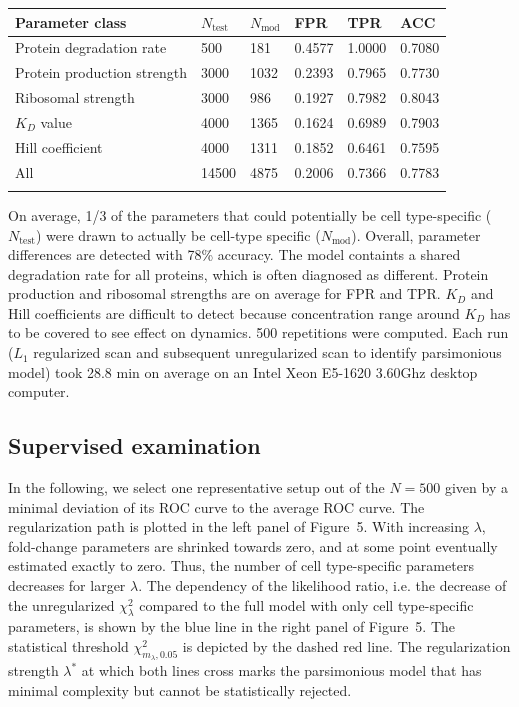 \documentclass{bioinfo}
\begin{document}
\begin{table}[!t]
 {\begin{tabular}{@{}llllll@{}}\toprule Parameter class &
$N_\text{test}$ & $N_\text{mod}$ & FPR & TPR & ACC\\\midrule
Protein degradation rate & 500 & 181 & 0.4577 & 1.0000 & 0.7080\\
Protein production strength & 3000 & 1032 & 0.2393 & 0.7965 & 0.7730\\
Ribosomal strength & 3000 & 986 & 0.1927 & 0.7982 & 0.8043\\
$K_D$ value & 4000 & 1365 & 0.1624 & 0.6989 & 0.7903\\
Hill coefficient & 4000 & 1311 & 0.1852 & 0.6461 & 0.7595\\\hline
All & 14500 & 4875 & 0.2006 & 0.7366 & 0.7783\\\botrule
\end{tabular}}{On average, 1/3 of the parameters that could potentially be cell type-specific ($N_\text{test}$) were drawn to actually be cell-type specific ($N_\text{mod}$). Overall, parameter differences are detected with 78\% accuracy. The model containts a shared degradation rate for all proteins, which is often diagnosed as different. Protein production and ribosomal strengths are on average for FPR and TPR. $K_D$ and Hill coefficients are difficult to detect because concentration range around $K_D$ has to be covered to see effect on dynamics. 500 repetitions were computed. Each run ($L_1$ regularized scan and subsequent unregularized scan to identify parsimonious model) took 28.8 min on average on an Intel Xeon E5-1620 3.60Ghz desktop computer.}
\end{table}

\subsection{Supervised examination} %
In the following, we select one representative setup out of the $N=500$ given by a minimal deviation of its ROC curve to the average ROC curve.
The regularization path is plotted in the left panel of Figure~5\vphantom{\ref{fig:05}}.
With increasing $\lambda$, fold-change parameters are shrinked towards zero, and at some point eventually estimated exactly to zero.
Thus, the number of cell type-specific parameters decreases for larger $\lambda$.
The dependency of the likelihood ratio, i.e. the decrease of the unregularized $\chi_\lambda^2$ compared to the full model with only cell type-specific parameters, is shown by the blue line in the right panel of Figure~5\vphantom{\ref{fig:05}}.
The statistical threshold $\chi^2_{m_\lambda,0.05}$ is depicted by the dashed red line.
The regularization strength $\lambda^*$ at which both lines cross marks the parsimonious model that has minimal complexity but cannot be statistically rejected.
\end{document}

